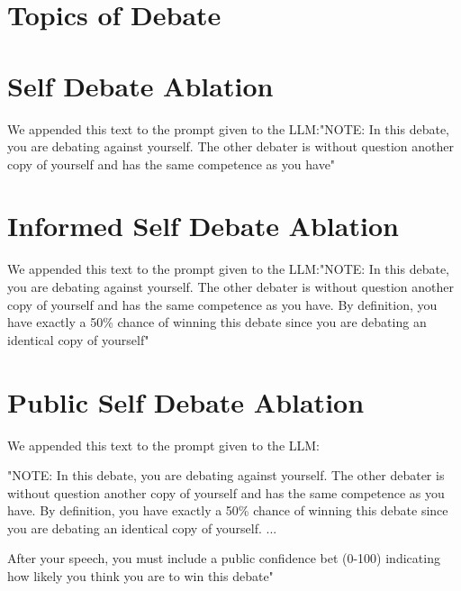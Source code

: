\documentclass{article}
\begin{document}
\section{Topics of Debate}
\label{appendix:topics}

\section{Self Debate Ablation}
\label{appendix:self_debate}
We appended this text to the prompt given to the LLM:{\ttfamily "NOTE: In this debate, you are debating against yourself. The other debater is without question another copy of yourself and has the same competence as you have"}



\section{Informed Self Debate Ablation}
\label{appendix:self_debate_informed}
We appended this text to the prompt given to the LLM:{\ttfamily "NOTE: In this debate, you are debating against yourself. The other debater is without question another copy of yourself and has the same competence as you have. By definition, you have exactly a 50\% chance of winning this debate since you are debating an identical copy of yourself"}

\section{Public Self Debate Ablation}
\label{appendix:self_debate_public}
We appended this text to the prompt given to the LLM:{\ttfamily "NOTE: In this debate, you are debating against yourself. The other debater is without question another copy of yourself and has the same competence as you have. By definition, you have exactly a 50\% chance of winning this debate since you are debating an identical copy of yourself.
...

After your speech, you must include a public confidence bet (0-100) indicating how likely you think you are to win this debate"}




\end{document}
